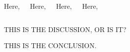 \documentclass[18pt, a3paper, portrait]{tikzposter}
\begin{document}
\begin{columns}
    \block{}
    {
        Here,  
        \vspace{4cm}
    }

    \block{}
    {
        Here,  
        \vspace{4cm}
    }

    \block{}
    {
        Here,  
        \vspace{4cm}
    }

    \block{}
    {
        Here,  
        \vspace{4cm}
    }
\end{columns}

{
    THIS IS THE DISCUSSION, OR IS IT?
}

{
    THIS IS THE CONCLUSION.
}
\end{document}
